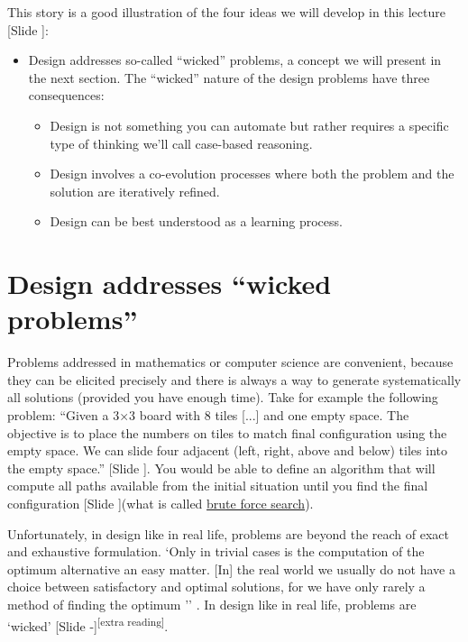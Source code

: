 \documentclass{article}
\newcounter{slide}
\begin{document}
This story is a good illustration of the four ideas we will develop in this lecture {\color{blue}[Slide ]}:
\begin{itemize}
	\item Design addresses so-called ``wicked'' problems, a concept we will present in the next section. The ``wicked'' nature of the design problems have three consequences:
	\begin{itemize}
		\item Design is not something you can automate but rather requires a specific type of thinking we'll call case-based reasoning.
		\item Design involves a co-evolution processes where both the problem and the solution are iteratively refined.
		\item Design can be best understood as a learning process.
	\end{itemize}
\end{itemize}
\section{Design addresses ``wicked problems''}
\label{sec:whatisdesign}

Problems addressed in mathematics or computer science are convenient, because they can be elicited precisely and there is always a way to generate systematically all solutions (provided you have enough time). Take for example the following problem: ``Given a 3×3 board with 8 tiles [...] and one empty space. The objective is to place the numbers on tiles to match final configuration using the empty space. We can slide four adjacent (left, right, above and below) tiles into the empty space.'' \cite{adityagoelPuzzleProblemUsing2016}{\color{blue}[Slide ]}. You would be able to define an algorithm that will compute all paths available from the initial situation until you find the final configuration {\color{blue}[Slide ]}(what is called \href{https://en.wikipedia.org/wiki/Brute-force_search}{brute force search}).

Unfortunately, in design like in real life, problems are beyond the reach of exact and exhaustive formulation. `Only in trivial cases is the computation of the optimum alternative an easy matter. [In] the real world we usually do not have a choice between satisfactory and optimal solutions, for we have only rarely a method of finding the optimum '' \cite[p. 118-120]{simon1996sciences}. In design like in real life, problems are `wicked' {\color{blue}[Slide -]}\cite{rittelDilemmasGeneralTheory1973}\textsuperscript{\color{Magenta}[extra reading]}. 
\end{document}
